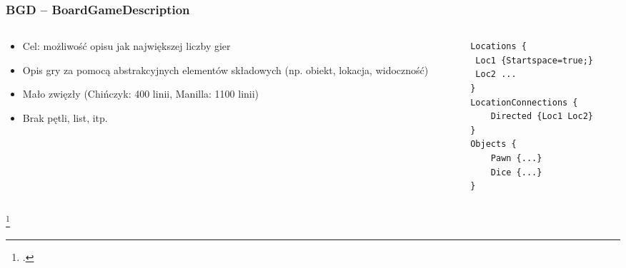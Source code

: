 \documentclass{beamer}
\begin{document}
\begin{frame}[fragile]
	\frametitle{BGD -- BoardGameDescription\setcounter{footnote}{0}\footnotemark}
	\begin{columns}
		\begin{column}{.5\textwidth}
			\begin{itemize}
				\item Cel: możliwość opisu jak największej liczby gier
				\item Opis gry za pomocą abstrakcyjnych elementów składowych (np. obiekt, lokacja, widoczność)
				\item Mało zwięzły (Chińczyk: 400 linii, Manilla: 1100 linii)
				\item Brak pętli, list, itp.
			\end{itemize}
		\end{column}%
		\hfill
		\begin{column}{.5\textwidth}
			\begin{lstlisting}
Locations {
 Loc1 {Startspace=true;}
 Loc2 ...
}
LocationConnections {
	Directed {Loc1 Loc2}
}
Objects {
	Pawn {...}
	Dice {...}
}
			\end{lstlisting}
		\end{column}
	\end{columns}
	\footcitetext{BGD}
\end{frame}


\end{document}
